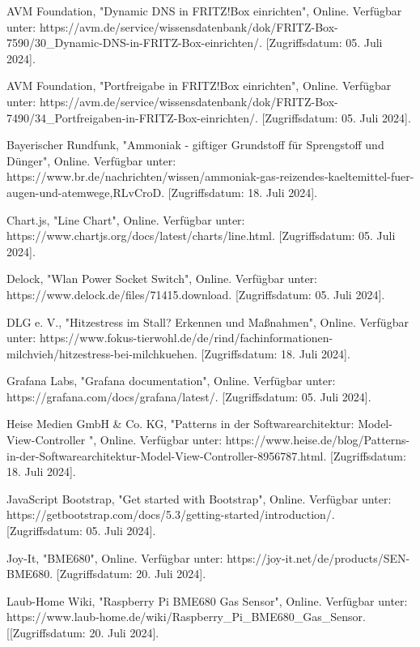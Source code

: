 \documentclass[conference]{IEEEtran}
\begin{document}
\newpage
\begin{thebibliography}{00}

AVM Foundation, "Dynamic DNS in FRITZ!Box einrichten", Online. Verfügbar unter: https://avm.de/service/wissensdatenbank/dok/FRITZ-Box-7590/30\_Dynamic-DNS-in-FRITZ-Box-einrichten/. [Zugriffsdatum: 05. Juli 2024].

AVM Foundation, "Portfreigabe in FRITZ!Box einrichten", Online. Verfügbar unter: https://avm.de/service/wissensdatenbank/dok/FRITZ-Box-7490/34\_Portfreigaben-in-FRITZ-Box-einrichten/. [Zugriffsdatum: 05. Juli 2024].

Bayerischer Rundfunk, "Ammoniak - giftiger Grundstoff für Sprengstoff und Dünger", Online. Verfügbar unter: https://www.br.de/nachrichten/wissen/ammoniak-gas-reizendes-kaeltemittel-fuer-augen-und-atemwege,RLvCroD. [Zugriffsdatum: 18. Juli 2024].

Chart.js, "Line Chart", Online. Verfügbar unter: https://www.chartjs.org/docs/latest/charts/line.html. [Zugriffsdatum: 05. Juli 2024].

Delock, "Wlan Power Socket Switch", Online. Verfügbar unter: https://www.delock.de/files/71415.download. [Zugriffsdatum: 05. Juli 2024].

DLG e. V., "Hitzestress im Stall? Erkennen und Maßnahmen", Online. Verfügbar unter: https://www.fokus-tierwohl.de/de/rind/fachinformationen-milchvieh/hitzestress-bei-milchkuehen. [Zugriffsdatum: 18. Juli 2024].

Grafana Labs, "Grafana documentation", Online. Verfügbar unter: https://grafana.com/docs/grafana/latest/. [Zugriffsdatum: 05. Juli 2024].

Heise Medien GmbH \& Co. KG, "Patterns in der Softwarearchitektur: Model-View-Controller ", Online. Verfügbar unter: https://www.heise.de/blog/Patterns-in-der-Softwarearchitektur-Model-View-Controller-8956787.html. [Zugriffsdatum: 18. Juli 2024].

JavaScript Bootstrap, "Get started with Bootstrap", Online. Verfügbar unter: https://getbootstrap.com/docs/5.3/getting-started/introduction/. [Zugriffsdatum: 05. Juli 2024].

Joy-It, "BME680", Online. Verfügbar unter: https://joy-it.net/de/products/SEN-BME680. [Zugriffsdatum: 20. Juli 2024].

Laub-Home Wiki, "Raspberry Pi BME680 Gas Sensor", Online. Verfügbar unter: https://www.laub-home.de/wiki/Raspberry\_Pi\_BME680\_Gas\_Sensor. [[Zugriffsdatum: 20. Juli 2024].


\end{thebibliography}
\end{document}

